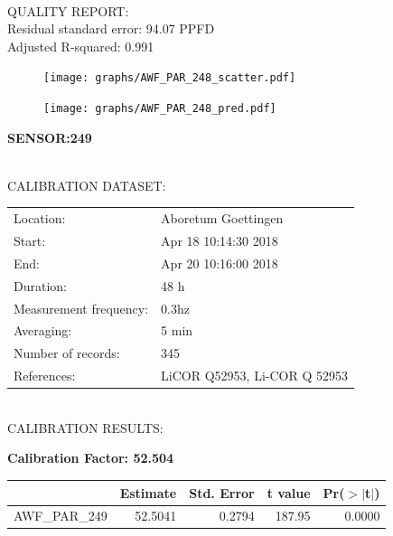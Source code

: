 \documentclass[oneside]{report}
\begin{document}
\hrulefill\\
QUALITY REPORT:\\
Residual standard error: 94.07 PPFD\\
Adjusted R-squared: 0.991



\begin{figure}[H]
  \centering
  \texttt{[image: graphs/AWF\_PAR\_248\_scatter.pdf]}
\end{figure}




\begin{figure}[H]
  \centering
  \texttt{[image: graphs/AWF\_PAR\_248\_pred.pdf]}
\end{figure}

\pagebreak


\begin{center}
\large{\textbf{SENSOR:249}}\\
\end{center}

\hrulefill\\
CALIBRATION DATASET:\\
\begin{table}[h!]
  \centering
  \label{tab:table1}
  \begin{tabular}{ll}
    Location: & Aboretum Goettingen\\ 
    
    
    Start:  & Apr 18 10:14:30 2018 \\
    End:   & Apr 20 10:16:00 2018\\ 
    Duration: & 48 h\\
    Measurement frequency: & 0.3hz\\
    Averaging:  &5 min\\
    Number of records: & 345 \\
    References: & LiCOR Q52953, Li-COR Q 52953 \\
  \end{tabular}
\end{table}

\hrulefill\\
CALIBRATION RESULTS:\\


\begin{center}
\textbf{\large{Calibration Factor: 52.504}}\\
\end{center}
\begin{table}[ht]
\centering
\begin{tabular}{rrrrr}
  \hline
 & Estimate & Std. Error & t value & Pr($>$$|$t$|$) \\ 
  \hline
AWF\_PAR\_249 & 52.5041 & 0.2794 & 187.95 & 0.0000 \\ 
   \hline
\end{tabular}
\end{table}
\end{document}
